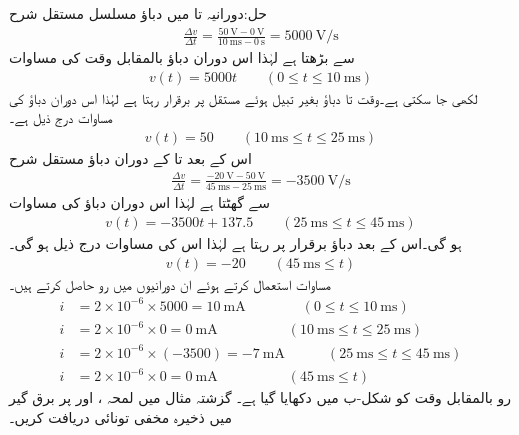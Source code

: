 حل:دورانیہ  تا  میں دباؤ مسلسل مستقل شرح
\begin{align*}
\frac{\Delta v}{\Delta t}=\frac{\SI{50}{\volt}-\SI{0}{\volt}}{\SI{10}{\milli\second}-\SI{0}{\second}}=\SI{5000}{\volt\per\second}
\end{align*}
 سے بڑھتا ہے لہٰذا اس دوران دباؤ بالمقابل وقت کی مساوات 
\begin{align*}
v(t)=5000 t \quad \quad (0 \le t \le \SI{10}{\milli\second})
\end{align*}
لکھی جا سکتی ہے۔وقت  تا  دباؤ بغیر تبیل ہوئے مستقل  پر برقرار رہتا ہے لہٰذا اس دوران دباؤ کی مساوات درج ذیل ہے۔
\begin{align*}
v(t)=50 \quad \quad (\SI{10}{\milli\second} \le t \le \SI{25}{\milli\second})
\end{align*}
اس کے بعد  تا  کے دوران دباؤ مستقل شرح
\begin{align*}
\frac{\Delta v}{\Delta t}=\frac{\SI{-20}{\volt}-\SI{50}{\volt}}{\SI{45}{\milli\second}-\SI{25}{\milli\second}}=\SI{-3500}{\volt \per \second}
\end{align*}
سے گھٹتا ہے لہٰذا اس دوران دباؤ کی مساوات
\begin{align*}
v(t)=-3500 t +137.5 \quad \quad (\SI{25}{\milli\second} \le t \le \SI{45}{\milli\second})
\end{align*}
ہو گی۔اس کے بعد دباؤ برقرار  پر رہتا ہے لہٰذا اس کی مساوات درج ذیل ہو گی۔
\begin{align*}
v(t)=-20 \quad \quad (\SI{45}{\milli\second} \le t)
\end{align*}
مساوات  استعمال کرتے ہوئے ان دورانیوں میں رو حاصل کرتے ہیں۔
\begin{align*}
i&=2\times 10^{-6} \times 5000=\SI{10}{\milli\ampere} \quad \quad \quad \quad  (0 \le t \le \SI{10}{\milli\second})\\
i&=2\times 10^{-6} \times 0=\SI{0}{\milli\ampere} \quad \quad \quad \quad \quad   (\SI{10}{\milli\second} \le t \le \SI{25}{\milli\second})\\
i&=2\times 10^{-6} \times (-3500)=\SI{-7}{\milli\ampere} \quad \quad   \quad  (\SI{25}{\milli\second} \le t \le \SI{45}{\milli\second})\\
i&=2\times 10^{-6} \times 0=\SI{0}{\milli\ampere} \quad \quad \quad \quad   \quad(\SI{45}{\milli\second} \le t)
\end{align*}
رو بالمقابل وقت کو شکل-ب میں دکھایا گیا ہے۔
گزشتہ مثال میں لمحہ ،  اور  پر برق گیر میں ذخیرہ مخفی تونائی دریافت کریں۔

